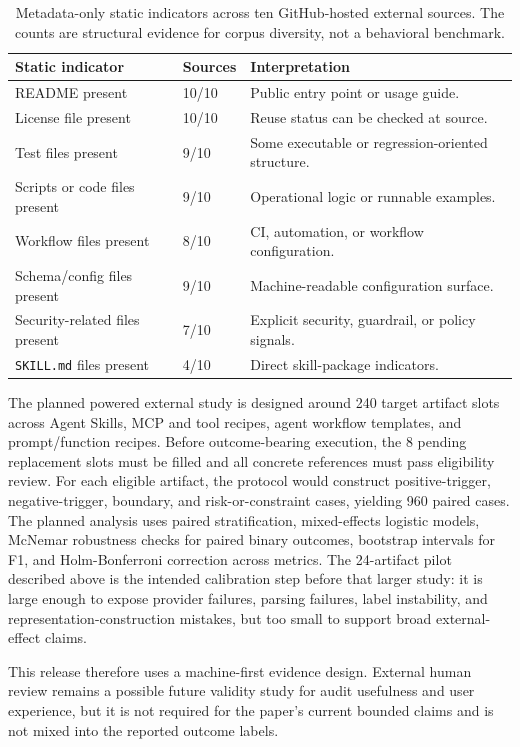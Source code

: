 \documentclass[11pt]{article}
\begin{document}
\begin{table}[t]
\centering
\footnotesize
\begin{tabular}{lll}
\toprule
\textbf{Static indicator} & \textbf{Sources} & \textbf{Interpretation} \\
\midrule
README present & 10/10 & Public entry point or usage guide. \\
License file present & 10/10 & Reuse status can be checked at source. \\
Test files present & 9/10 & Some executable or regression-oriented structure. \\
Scripts or code files present & 9/10 & Operational logic or runnable examples. \\
Workflow files present & 8/10 & CI, automation, or workflow configuration. \\
Schema/config files present & 9/10 & Machine-readable configuration surface. \\
Security-related files present & 7/10 & Explicit security, guardrail, or policy signals. \\
\texttt{SKILL.md} files present & 4/10 & Direct skill-package indicators. \\
\bottomrule
\end{tabular}
\caption{Metadata-only static indicators across ten GitHub-hosted external
sources. The counts are structural evidence for corpus diversity, not a
behavioral benchmark.}
\label{tab:external-static}
\end{table}

The planned powered external study is designed around 240 target artifact slots across
Agent Skills, MCP and tool recipes, agent workflow templates, and
prompt/function recipes. Before outcome-bearing execution, the 8 pending
replacement slots must be filled and all concrete references must pass
eligibility review. For each eligible artifact, the protocol would construct
positive-trigger, negative-trigger, boundary, and risk-or-constraint cases,
yielding 960 paired cases. The planned analysis uses
paired stratification, mixed-effects logistic models, McNemar robustness
checks for paired binary outcomes, bootstrap intervals for F1, and
Holm-Bonferroni correction across metrics. The 24-artifact pilot described
above is the intended calibration step before that larger study: it is large
enough to expose provider failures, parsing failures, label instability, and
representation-construction mistakes, but too small to support broad
external-effect claims.

This release therefore uses a machine-first evidence design. External human
review remains a possible future validity study for audit usefulness and user
experience, but it is not required for the paper's current bounded claims and
is not mixed into the reported outcome labels.
\end{document}
